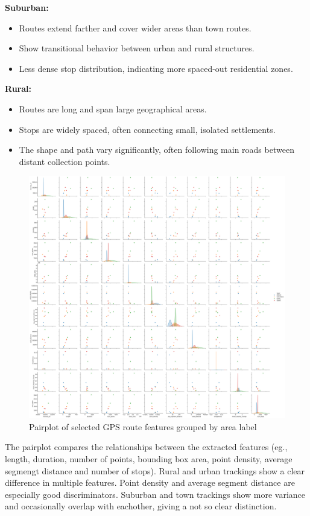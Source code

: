 \documentclass[a4paper,12pt,twoside]{scrreprt}
\begin{document}
\textbf{Suburban:}
\begin{itemize}
  \item Routes extend farther and cover wider areas than town routes.
  \item Show transitional behavior between urban and rural structures.
  \item Less dense stop distribution, indicating more spaced-out residential
        zones.
\end{itemize}

\textbf{Rural:}
\begin{itemize}
  \item Routes are long and span large geographical areas.
  \item Stops are widely spaced, often connecting small, isolated settlements.
  \item The shape and path vary significantly, often following main roads
        between distant collection points.
\end{itemize}

\begin{figure}[htbp]
  \centering
  \includegraphics[width=\textwidth]{Figures/sample_pairplot.png}
  \caption{Pairplot of selected GPS route features grouped by area label}
  \label{fig:sample_pairplot}
\end{figure}
\FloatBarrier

The pairplot compares the relationships between the extracted features (eg.,
length, duration, number of points, bounding box area, point density, average
segmengt distance and number of stops). Rural and urban trackings show a clear
difference in multiple features. Point density and average segment distance are
especially good discriminators. Suburban and town trackings show more variance
and occasionally overlap with eachother, giving a not so clear distinction.
\end{document}
